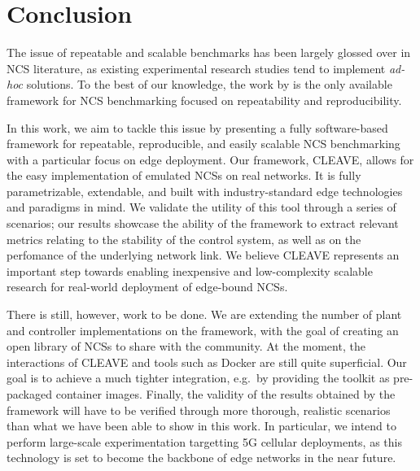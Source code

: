 \section{Conclusion}\label{sec:conclusion}

The issue of repeatable and scalable benchmarks has been largely glossed over in \ac{NCS} literature, as existing experimental research studies tend to implement \emph{ad-hoc} solutions.
To the best of our knowledge, the work by \textcite{Zoppi2020NCSBench} is the only available framework for \ac{NCS} benchmarking focused on repeatability and reproducibility.

In this work, we aim to tackle this issue by presenting a fully software-based framework for repeatable, reproducible, and easily scalable \ac{NCS} benchmarking with a particular focus on edge deployment.
Our framework, \ac{CLEAVE}, allows for the easy implementation of emulated \acp{NCS} on real networks.
It is fully parametrizable, extendable, and built with industry-standard edge technologies and paradigms in mind.
We validate the utility of this tool through a series of scenarios; our results showcase the ability of the framework to extract relevant metrics relating to the stability of the control system, as well as on the perfomance of the underlying network link.
We believe \ac{CLEAVE} represents an important step towards enabling inexpensive and low-complexity scalable research for real-world deployment of edge-bound \acp{NCS}.

There is still, however, work to be done.
We are extending the number of plant and controller implementations on the framework, with the goal of creating an open library of \acp{NCS} to share with the community.
At the moment, the interactions of \ac{CLEAVE} and tools such as Docker are still quite superficial.
Our goal is to achieve a much tighter integration, e.g.\ by providing the toolkit as pre-packaged container images.
Finally, the validity of the results obtained by the framework will have to be verified through more thorough, realistic scenarios than what we have been able to show in this work.
In particular, we intend to perform large-scale experimentation targetting 5G cellular deployments, as this technology is set to become the backbone of edge networks in the near future.

